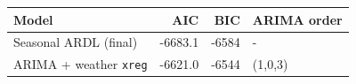 
\begin{tabular}{lrrl}
\toprule
Model & AIC & BIC & ARIMA order\\
\midrule
Seasonal ARDL (final) & -6683.1 & -6584 & -\\
ARIMA + weather \texttt{xreg} & -6621.0 & -6544 & (1,0,3)\\
\bottomrule
\end{tabular}
